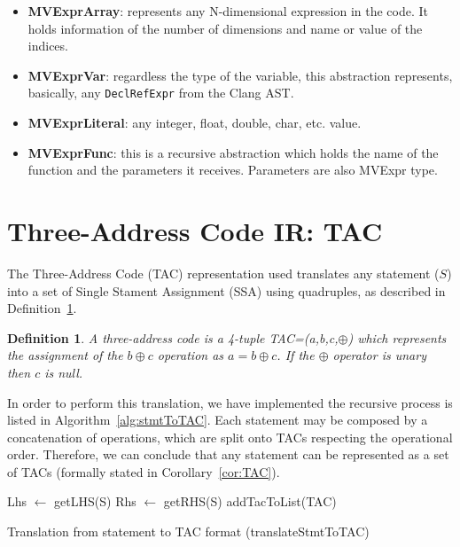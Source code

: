 \documentclass[a4paper,12pt]{memoir}
\newtheorem{definition}{Definition}[]
\begin{document}
\begin{itemize}
	\item \textbf{MVExprArray}: represents any N-dimensional expression in the
	      code. It
	      holds information of the number of dimensions and name or value of the
	      indices.
	\item \textbf{MVExprVar}: regardless the type of the variable, this
	      abstraction
	      represents, basically, any \texttt{DeclRefExpr} from the Clang AST.
	\item \textbf{MVExprLiteral}: any integer, float, double, char, etc. value.
	\item \textbf{MVExprFunc}: this is a recursive abstraction which holds the
	      name of the function and the parameters it receives. Parameters are also
	      MVExpr
	      type.
\end{itemize}

\section{Three-Address Code IR: TAC}
The Three-Address Code (TAC) representation used translates any statement ($S$)
into a
set of Single Stament Assignment (SSA) using quadruples, as described in
Definition~\ref{def:TAC}.

\theoremstyle{definition}
\begin{definition}\label{def:TAC}
	A three-address code is a 4-tuple TAC=(a,b,c,$\oplus$) which represents the
	assignment of the $b \oplus c$ operation as $a
		=
		b \oplus c$. If the $\oplus$ operator is unary then $c$ is null.
\end{definition}

In order to perform this translation, we have implemented the recursive process
is listed in
Algorithm~\ref{alg:stmtToTAC}. Each statement may be composed by a
concatenation of operations, which are split onto TACs respecting the
operational order. Therefore, we can conclude that any statement
can be represented as a set of TACs (formally stated in
Corollary~\ref{cor:TAC}).

\begin{algorithm}[H]\label{alg:stmtToTAC}
	\SetAlgoLined
	Lhs $\leftarrow$ getLHS(S)\;
	Rhs $\leftarrow$ getRHS(S)\;
	addTacToList(TAC)\;
	\caption{Translation from statement to TAC format (translateStmtToTAC)}
\end{algorithm}
\end{document}
